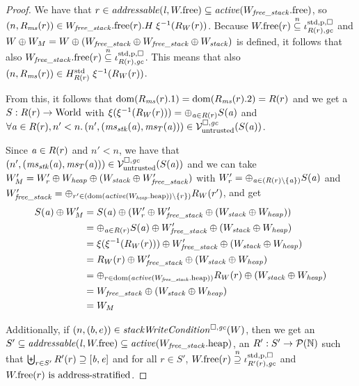 \documentclass[a4paper]{article}
\begin{document}
\begin{proof}
  We have that $r \in \addressable{\lin, \pwfree} \subseteq
  \activeReg{\pwfree[W_\var{free\_stack}]}$, so $\npair{R_\ms(r)} \in
  \pwfree[W_\var{free\_stack}](r).H \; \xi^{-1}(R_W(r))$.
  Because $\pwfree(r) \nsubeq \stdreg{R(r),\gc}{\pur}$ and $W\oplus W_M = W \oplus (W_\var{free\_stack} \oplus W_\var{free\_stack} \oplus W_\var{stack})$ is defined, it follows that
  also $\pwfree[W_\var{free\_stack}](r) \nsubeq \stdreg{R(r),\gc}{\pur}$. This
  means that also $\npair{R_\ms(r)} \in
  H^{\mathrm{std}}_{R(r)}\; \xi^{-1}(R_W(r))$.

  From this, it follows that $\dom(R_\ms(r).1) = \dom(R_\ms(r).2) = R(r)$ and we get a $S : R(r) \fun \World$ with $\xi(\xi^{-1}(R_W(r))) = \oplus_{\aaddr \in R(r)} S(\aaddr)$ and $\forall \aaddr \in R(r),n' < n \ldotp \npair[n']{(\ms_\stk(\aaddr),\ms_T(\aaddr))} \in \lrv(S(\aaddr))$.

  Since $\aaddr \in R(r)$ and $n' < n$, we have that $\npair[n']{(\ms_\stk(\aaddr),\ms_T(\aaddr))} \in \lrv(S(\aaddr))$ and
  we can take $W_M' = W_r' \oplus W_{\var{heap}} \oplus (W_{\var{stack}} \oplus W_{\var{free\_stack}}')$ with $W_r' = \oplus_{\aaddr \in (R(r)\setminus \{\aaddr\})} S(\aaddr)$ and $W_\var{free\_stack}' = \oplus_{r' \in (\dom(\activeReg{\pwheap[W_\var{heap}]})\setminus \{r\})} R_W(r')$, and get
  \begin{align*}
    S(\aaddr) \oplus W_M'
    &=S(\aaddr) \oplus (W_r' \oplus W_{\var{free\_stack}}' \oplus (W_{\var{stack}}\oplus W_\var{heap}))\\
    &=
    \oplus_{\aaddr \in R(r)} S(\aaddr) \oplus W_{\var{free\_stack}}' \oplus (W_{\var{stack}}\oplus W_{\var{heap}})\\
    &=
    \xi(\xi^{-1}(R_W(r))) \oplus W_{\var{free\_stack}}' \oplus (W_{\var{stack}} \oplus W_\var{heap})\\
    &=
    R_W(r) \oplus W_{\var{free\_stack}}' \oplus (W_{\var{stack}} \oplus W_\var{heap})\\
    &=
    \oplus_{r \in \dom(\activeReg{\pwheap[W_\var{free\_stack}]})} R_W(r)\oplus (W_{\var{stack}} \oplus W_{\var{heap}})\\
    &=
      W_\var{free\_stack} \oplus (W_{\var{stack}} \oplus W_{\var{heap}})\\
      &= W_M
  \end{align*}

  Additionally, if $\npair{(b,e)}\in\stackWriteCond{W}$, then
  we get an $S'\subseteq \addressable{\lin, \pwfree} \subseteq \activeReg{\pwheap[W_\var{free\_stack}]}$, an $R' : S' \fun \powerset{\nats}$ such that $\biguplus_{r \in S'} R'(r) \supseteq [\baddr,\eaddr]$ and
  for all $r \in S'$, $\pwfree(r) \nsupeq \stdreg{R'(r),\gc}{\pur}$ and
  $\pwfree(r) \text{ is address-stratified}$.


\end{proof}
\end{document}
